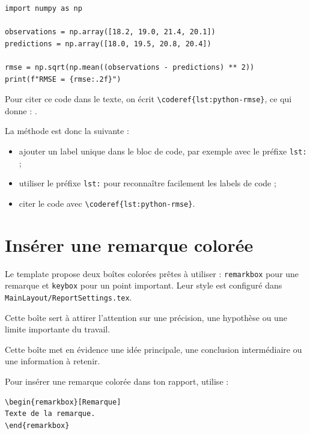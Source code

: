 \begin{lstlisting}[style=pythonstyle, caption={Exemple de calcul de RMSE en Python.}, label={lst:python-rmse}]
import numpy as np

observations = np.array([18.2, 19.0, 21.4, 20.1])
predictions = np.array([18.0, 19.5, 20.8, 20.4])

rmse = np.sqrt(np.mean((observations - predictions) ** 2))
print(f"RMSE = {rmse:.2f}")
\end{lstlisting}

Pour citer ce code dans le texte, on écrit \verb|\coderef{lst:python-rmse}|, ce qui donne : .

La méthode est donc la suivante :

\begin{itemize}
  \item ajouter un label unique dans le bloc de code, par exemple avec le préfixe \texttt{lst:} ;
  \item utiliser le préfixe \texttt{lst:} pour reconnaître facilement les labels de code ;
  \item citer le code avec \verb|\coderef{lst:python-rmse}|.
\end{itemize}


\section{Insérer une remarque colorée}

Le template propose deux boîtes colorées prêtes à utiliser : \texttt{remarkbox} pour une remarque et \texttt{keybox} pour un point important. Leur style est configuré dans \texttt{MainLayout/ReportSettings.tex}.

\begin{remarkbox}[Remarque]
Cette boîte sert à attirer l'attention sur une précision, une hypothèse ou une limite importante du travail.
\end{remarkbox}

\begin{keybox}
Cette boîte met en évidence une idée principale, une conclusion intermédiaire ou une information à retenir.
\end{keybox}

Pour insérer une remarque colorée dans ton rapport, utilise :

\begin{verbatim}
\begin{remarkbox}[Remarque]
Texte de la remarque.
\end{remarkbox}
\end{verbatim}

